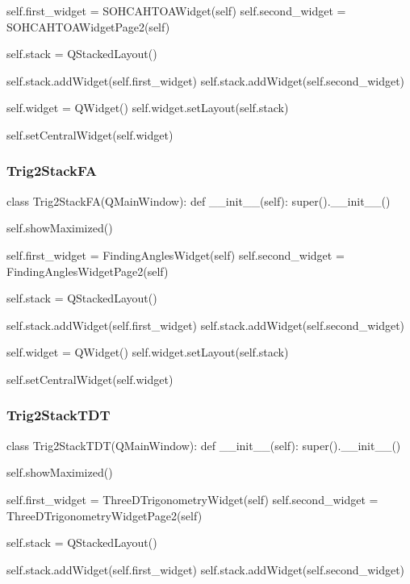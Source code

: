 \begin{landscape}
\begin{python}
        self.first_widget = SOHCAHTOAWidget(self)
        self.second_widget = SOHCAHTOAWidgetPage2(self)

        self.stack = QStackedLayout()

        self.stack.addWidget(self.first_widget)
        self.stack.addWidget(self.second_widget)

        self.widget = QWidget()
        self.widget.setLayout(self.stack)

        self.setCentralWidget(self.widget)
\end{python}

\subsubsection{Trig2StackFA}

\begin{python}
class Trig2StackFA(QMainWindow):
    def __init__(self):
        super().__init__()

        self.showMaximized()
        
        self.first_widget = FindingAnglesWidget(self)
        self.second_widget = FindingAnglesWidgetPage2(self)

        self.stack = QStackedLayout()

        self.stack.addWidget(self.first_widget)
        self.stack.addWidget(self.second_widget)

        self.widget = QWidget()
        self.widget.setLayout(self.stack)

        self.setCentralWidget(self.widget)
\end{python}

\subsubsection{Trig2StackTDT}

\begin{python}
class Trig2StackTDT(QMainWindow):
    def __init__(self):
        super().__init__()

        self.showMaximized()
        
        self.first_widget = ThreeDTrigonometryWidget(self)
        self.second_widget = ThreeDTrigonometryWidgetPage2(self)

        self.stack = QStackedLayout()

        self.stack.addWidget(self.first_widget)
        self.stack.addWidget(self.second_widget)


\end{python}
\end{landscape}
